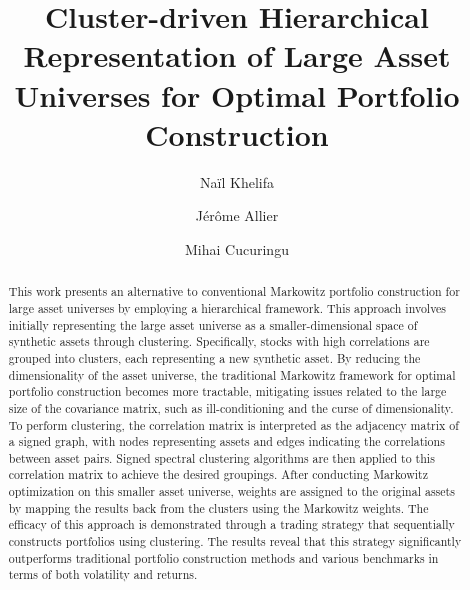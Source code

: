 \documentclass[sigconf]{acmart}
\begin{document}
\title{Cluster-driven Hierarchical Representation of Large Asset Universes for Optimal Portfolio Construction}




 \author{Naïl Khelifa}

 \author{Jérôme Allier}



\author{Mihai Cucuringu}



\begin{abstract}
This work presents an alternative to conventional Markowitz portfolio construction for large asset universes by employing a hierarchical framework. This approach involves initially representing the large asset universe as a smaller-dimensional space of synthetic assets through clustering. Specifically, stocks with high correlations are grouped into clusters, each representing a new synthetic asset. By reducing the dimensionality of the asset universe, the traditional Markowitz framework for optimal portfolio construction becomes more tractable, mitigating issues related to the large size of the covariance matrix, such as ill-conditioning and the curse of dimensionality. To perform clustering, the correlation matrix is interpreted as the adjacency matrix of a signed graph, with nodes representing assets and edges indicating the correlations between asset pairs. Signed spectral clustering algorithms are then applied to this correlation matrix to achieve the desired groupings. After conducting Markowitz optimization on this smaller asset universe, weights are assigned to the original assets by mapping the results back from the clusters using the Markowitz weights. The efficacy of this approach is demonstrated through a trading strategy that sequentially constructs portfolios using clustering. The results reveal that this strategy significantly outperforms traditional portfolio construction methods and various benchmarks in terms of both volatility and returns.
\end{abstract}
\end{document}
